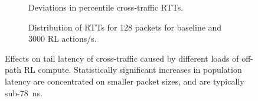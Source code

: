 \documentclass[
sigconf,natbib=false
]{acmart}
\begin{document}
\begin{figure}
	\centering
	\begin{subfigure}{0.45\linewidth}
		\caption{Deviations in  percentile cross-traffic RTTs.\label{fig:dataplane-heat}}
	\end{subfigure}
	\hspace{0.05\linewidth}
		\begin{subfigure}{0.45\linewidth}
		\caption{Distribution of RTTs for \SI{128}{\byte} packets for baseline and \num{3000} RL actions/s.\label{fig:dataplane-example}}
	\end{subfigure}
	\caption{Effects on tail latency of cross-traffic caused by different loads of off-path RL compute. Statistically significant increases in population latency are concentrated on smaller packet sizes, and are typically sub-\SI{78}{\nano\second}.\label{fig:dataplane-coop}}
\end{figure}
\end{document}
